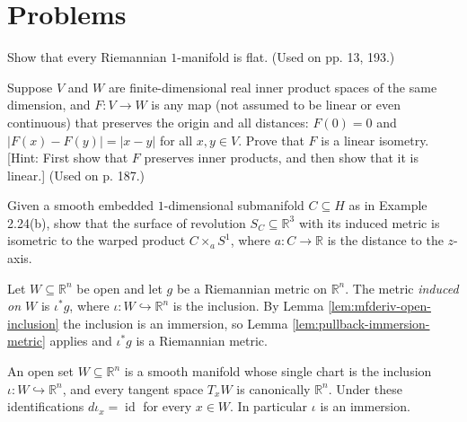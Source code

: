\section{Problems}

\begin{exercise}\label{prob:riemannian-1-manifold-flat}
Show that every Riemannian $1$-manifold is flat. (Used on pp. 13, 193.)
\end{exercise}

\begin{exercise}\label{prob:distance-preserving-map-linear-isometry}
\leanok
Suppose $V$ and $W$ are finite-dimensional real inner product spaces of the same dimension, and $F: V \to W$ is any map (not assumed to be linear or even continuous) that preserves the origin and all distances: $F(0) = 0$ and $|F(x) - F(y)| = |x - y|$ for all $x, y \in V$. Prove that $F$ is a linear isometry. [Hint: First show that $F$ preserves inner products, and then show that it is linear.] (Used on p. 187.)
\end{exercise}

\begin{exercise}\label{prob:surface-of-revolution-warped-product}
Given a smooth embedded $1$-dimensional submanifold $C \subseteq H$ as in Example 2.24(b), show that the surface of revolution $S_C \subseteq \mathbb{R}^3$ with its induced metric is isometric to the warped product $C \times_a S^1$, where $a: C \to \mathbb{R}$ is the distance to the $z$-axis.
\end{exercise}

\begin{definition}
\label{def:open-submanifold-metric}
\leanok
{}
Let $W \subseteq \mathbb{R}^n$ be open and let $g$ be a Riemannian metric on $\mathbb{R}^n$. The metric \emph{induced on $W$} is $\iota^* g$, where $\iota : W \hookrightarrow \mathbb{R}^n$ is the inclusion. By Lemma \ref{lem:mfderiv-open-inclusion} the inclusion is an immersion, so Lemma \ref{lem:pullback-immersion-metric} applies and $\iota^* g$ is a Riemannian metric.
\end{definition}

\begin{lemma}
\label{lem:mfderiv-open-inclusion}
\leanok
An open set $W \subseteq \mathbb{R}^n$ is a smooth manifold whose single chart is the inclusion $\iota : W \hookrightarrow \mathbb{R}^n$, and every tangent space $T_x W$ is canonically $\mathbb{R}^n$. Under these identifications $d\iota_x = \operatorname{id}$ for every $x \in W$. In particular $\iota$ is an immersion.
\end{lemma}

